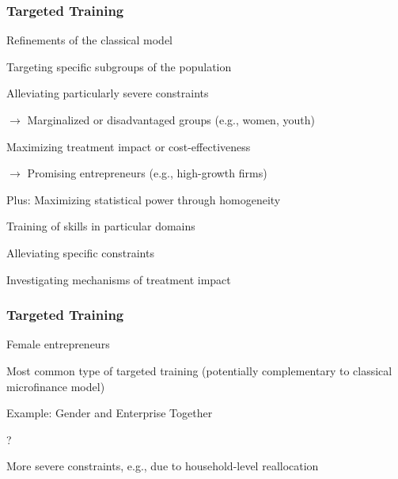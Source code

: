 \documentclass[hideothersubsections, usenames,dvipsnames,11pt]{beamer}
\newenvironment{itemize_2pt}{\itemize\addtolength{\itemsep}{2pt}}{\enditemize}
\begin{document}
\begin{frame}
\frametitle{Targeted Training}
	Refinements of the classical model
	
	\vspace{0.5em}
	
	\begin{itemize_2pt}
		\item Targeting \textcolor{bdf}{specific subgroups} of the population
		\begin{itemize_2pt}
			\item Alleviating \textcolor{bdf}{particularly severe constraints}
			\item[] $\rightarrow$ Marginalized or disadvantaged groups (e.g., women, youth)
			\item  Maximizing \textcolor{bdf}{treatment impact} or cost-effectiveness 
			\item[] $\rightarrow$ Promising entrepreneurs (e.g., high-growth firms)
			
			\vspace{0.5em}			
			
			\item Plus: \textcolor{bdf}{Maximizing statistical power} through homogeneity
		\end{itemize_2pt}
		
	\vspace{1.0em}		
		
		\item Training of skills in \textcolor{bdf}{particular domains}
		\begin{itemize_2pt}
			\item Alleviating \textcolor{bdf}{specific constraints}
			\item Investigating mechanisms of treatment impact
		\end{itemize_2pt}
	\end{itemize_2pt}
\end{frame}

\begin{frame}
\frametitle{Targeted Training}
	Female entrepreneurs
	\begin{itemize_2pt}
		\item \textcolor{bdf}{Most common type of targeted training} (potentially complementary to classical microfinance model)
		\item Example: Gender and Enterprise Together \citep[GET Ahead, ILO;][]{Bulte2016,McKenziePuerto2020}
		\item ?
		\item More severe constraints, e.g., due to household-level reallocation \citep{Bernhardt2019, deMel2009}
	\vspace{0.1in}
	\end{itemize_2pt}
\end{frame}
\end{document}
